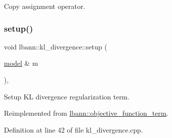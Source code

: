 Copy assignment operator. \mbox{\label{classlbann_1_1kl__divergence_acaa96d2e2fcf164c2e7b5cd5a0bf222e}} 
\subsubsection{\texorpdfstring{setup()}{setup()}}
{\footnotesize\ttfamily void lbann\+::kl\+\_\+divergence\+::setup (\begin{DoxyParamCaption}\item[{\hyperlink{classlbann_1_1model}{model} \&}]{m }\end{DoxyParamCaption})\hspace{0.3cm}{\ttfamily [override]}, {\ttfamily [virtual]}}

Setup KL divergence regularization term. 

Reimplemented from \hyperlink{classlbann_1_1objective__function__term_a6c8dbdf18aac8676098189fb7b178e91}{lbann\+::objective\+\_\+function\+\_\+term}.



Definition at line 42 of file kl\+\_\+divergence.\+cpp.


